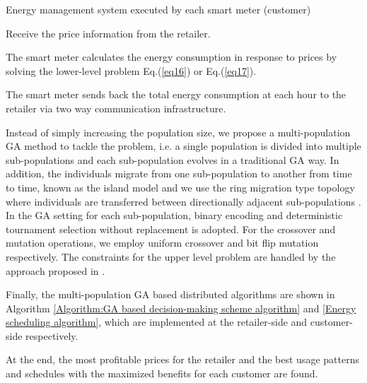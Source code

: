 \documentclass[10pt,journal]{IEEEtran}
\theoremstyle{definition}
\theoremstyle{plain} \newtheorem{theo}{Theorem} \newtheorem{prop}{Proposition}  \newtheorem{lemm}{Lemma}
\begin{document}
\begin{algorithm}[!t]

\renewcommand{\algorithmicrequire}{\textbf{}}



\caption{Energy management system executed by each smart meter (customer)}
\label{Energy scheduling algorithm}

\begin{algorithmic}[1]

\STATE Receive the price information from the retailer.

\STATE The smart meter calculates the energy consumption in response to prices by solving the lower-level problem Eq.(\ref{eq16}) or Eq.(\ref{eq17}).

\STATE The smart meter sends back the total energy consumption at each hour to the retailer via two way communication infrastructure. 

\end{algorithmic}
\end{algorithm}

Instead of simply increasing the population size, we propose a multi-population GA method \cite{muhlenbein1991parallel} to tackle the problem, i.e. a single population is divided into multiple sub-populations and each sub-population evolves in a traditional GA way. In addition, the individuals migrate from one sub-population to another from time to time, known as the island model \cite{whitley1999island} and we use the ring migration type topology where individuals are 
transferred between directionally adjacent sub-populations \cite{tang1996genetic}. In the GA setting for each sub-population, binary encoding and deterministic tournament selection without replacement is adopted. For the crossover and mutation operations, we employ uniform crossover and bit flip mutation respectively. The constraints for the upper level problem are handled by the approach proposed in \cite{deb2000efficient}.







Finally, the multi-population GA based distributed algorithms are shown in Algorithm \ref{Algorithm:GA based decision-making scheme algorithm} and \ref{Energy scheduling algorithm}, which are implemented at the retailer-side and customer-side respectively. 



At the end, the most profitable prices for the retailer and the best usage patterns and schedules with the maximized benefits for each customer are found. 
\end{document}
